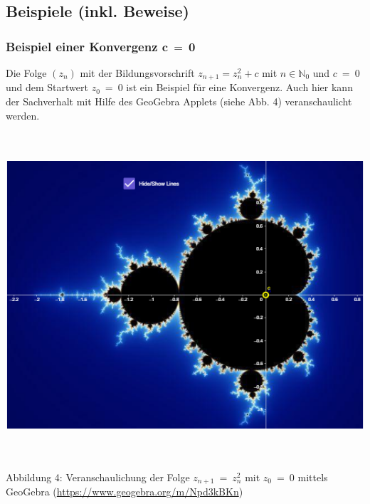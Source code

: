 \documentclass[a4paper, 12pt]{book}
\begin{document}
\hypertarget{beispiele-inkl.-beweise}{%
\subsection{\texorpdfstring{Beispiele (inkl. Beweise)
}{Beispiele (inkl. Beweise) }}\label{beispiele-inkl.-beweise}}

\hypertarget{beispiel-einer-konvergenz-mathbfc-0}{%
\subsubsection{\texorpdfstring{Beispiel einer Konvergenz
\(\mathbf{c\  = \ 0}\)}{Beispiel einer Konvergenz \textbackslash mathbf\{c\textbackslash{}  = \textbackslash{} 0\}}}\label{beispiel-einer-konvergenz-mathbfc-0}}

Die Folge \(\left( z_{n} \right)\) mit der Bildungsvorschrift
\(z_{n + 1} = z_{n}^{2} + c\) mit \(n \in \mathbb{N}_{0}\) und
\(c\  = \ 0\) und dem Startwert \(z_{0}\  = \ 0\) ist ein Beispiel für
eine Konvergenz. Auch hier kann der Sachverhalt mit Hilfe des GeoGebra
Applets (siehe Abb. 4) veranschaulicht werden.

\includegraphics[width=6.33858in,height=4.74805in]{image9.png}

\protect\hypertarget{_Toc167901654}{}{}Abbildung 4: Veranschaulichung
der Folge \(z_{n + 1}\  = \ z_{n}^{2}\) mit \(z_{0}\  = \ 0\) mittels
GeoGebra (\url{https://www.geogebra.org/m/Npd3kBKn})
\end{document}

